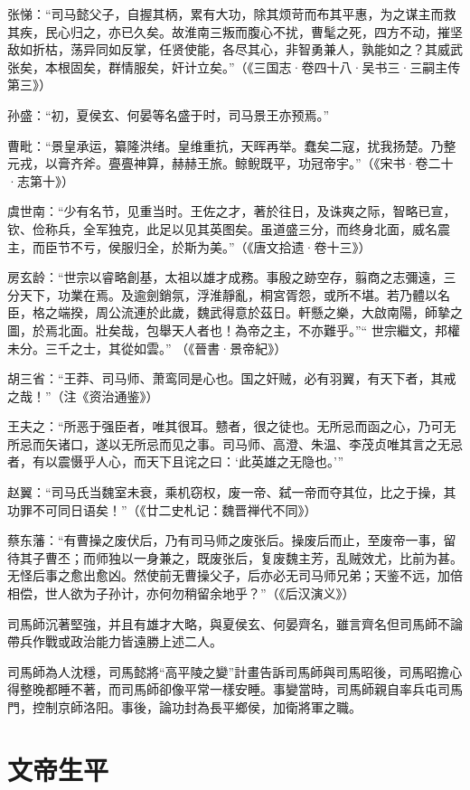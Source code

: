 张悌：“司马懿父子，自握其柄，累有大功，除其烦苛而布其平惠，为之谋主而救其疾，民心归之，亦已久矣。故淮南三叛而腹心不扰，曹髦之死，四方不动，摧坚敌如折枯，荡异同如反掌，任贤使能，各尽其心，非智勇兼人，孰能如之？其威武张矣，本根固矣，群情服矣，奸计立矣。”（《三国志·卷四十八·吴书三·三嗣主传第三》）

孙盛：“初，夏侯玄、何晏等名盛于时，司马景王亦预焉。”

曹毗：“景皇承运，纂隆洪绪。皇维重抗，天晖再举。蠢矣二寇，扰我扬楚。乃整元戎，以膏齐斧。亹亹神算，赫赫王旅。鲸鲵既平，功冠帝宇。”（《宋书·卷二十·志第十》）

虞世南：“少有名节，见重当时。王佐之才，著於往日，及诛爽之际，智略已宣，钦、俭称兵，全军独克，此足以见其英图矣。虽道盛三分，而终身北面，威名震主，而臣节不亏，侯服归全，於斯为美。”（《唐文拾遗·卷十三》）

房玄龄：“世宗以睿略創基，太祖以雄才成務。事殷之跡空存，翦商之志彌遠，三分天下，功業在焉。及逾劍銷氛，浮淮靜亂，桐宮胥怨，或所不堪。若乃體以名臣，格之端揆，周公流連於此歲，魏武得意於茲日。軒懸之樂，大啟南陽，師摯之圖，於焉北面。壯矣哉，包舉天人者也！為帝之主，不亦難乎。”“ 世宗繼文，邦權未分。三千之士，其從如雲。” （《晉書·景帝紀》）

胡三省：“王莽、司马师、萧鸾同是心也。国之奸贼，必有羽翼，有天下者，其戒之哉！”（注《资治通鉴》）

王夫之：“所恶于强臣者，唯其很耳。戆者，很之徒也。无所忌而函之心，乃可无所忌而矢诸口，遂以无所忌而见之事。司马师、高澄、朱温、李茂贞唯其言之无忌者，有以震慑乎人心，而天下且诧之曰：‘此英雄之无隐也。’”

赵翼：“司马氏当魏室未衰，乘机窃权，废一帝、弑一帝而夺其位，比之于操，其功罪不可同日语矣！”（《廿二史札记：魏晋禅代不同》）

蔡东藩：“有曹操之废伏后，乃有司马师之废张后。操废后而止，至废帝一事，留待其子曹丕；而师独以一身兼之，既废张后，复废魏主芳，乱贼效尤，比前为甚。无怪后事之愈出愈凶。然使前无曹操父子，后亦必无司马师兄弟；天鉴不远，加倍相偿，世人欲为子孙计，亦何勿稍留余地乎？”（《后汉演义》）

司馬師沉著堅強，并且有雄才大略，與夏侯玄、何晏齊名，雖言齊名但司馬師不論帶兵作戰或政治能力皆遠勝上述二人。

司馬師為人沈穩，司馬懿將“高平陵之變”計畫告訴司馬師與司馬昭後，司馬昭擔心得整晚都睡不著，而司馬師卻像平常一樣安睡。事變當時，司馬師親自率兵屯司馬門，控制京師洛阳。事後，論功封為長平鄉侯，加衛將軍之職。

\section{文帝生平}

